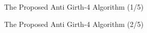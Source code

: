 \documentclass[11pt, aspectratio=169]{beamer}
\begin{document}
\begin{frame}{The Proposed Anti Girth-4 Algorithm (1/5)}

\end{frame}


\begin{frame}{The Proposed Anti Girth-4 Algorithm (2/5)}
	

\end{frame}
\end{document}
